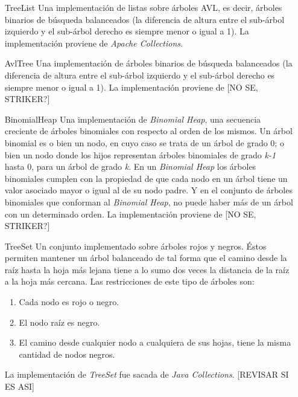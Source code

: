 \begin{enumerate}[leftmargin=.75cm,align=left,style=nextline]
	\item[TreeList] Una implementaci\'on de listas sobre \'arboles AVL, es decir, \'arboles binarios de b\'usqueda balanceados (la diferencia de altura entre el sub-\'arbol izquierdo y el sub-\'arbol derecho es siempre menor o igual a 1). La implementaci\'on proviene de \emph{Apache Collections}.
	
	\item[AvlTree] Una implementaci\'on de \'arboles binarios de b\'usqueda balanceados (la diferencia de altura entre el sub-\'arbol izquierdo y el sub-\'arbol derecho es siempre menor o igual a 1). La implementaci\'on proviene de [NO SE, STRIKER?]
	
	\item[BinomialHeap] Una implementaci\'on de \emph{Binomial Heap}, una secuencia creciente de \'arboles binomiales con respecto al orden de los mismos. Un \'arbol binomial es o bien un nodo, en cuyo caso se trata de un \'arbol de grado 0; o bien un nodo donde los hijos representan \'arboles binomiales de grado \emph{k-1} hasta 0, para un \'arbol de grado \emph{k}. En un \emph{Binomial Heap} los \'arboles binomiales cumplen con la propiedad de que cada nodo en un \'arbol tiene un valor asociado mayor o igual al de su nodo padre. Y en el conjunto de \'arboles binomiales que conforman al \emph{Binomial Heap}, no puede haber m\'as de un \'arbol con un determinado orden. La implementaci\'on proviene de [NO SE, STRIKER?]
	
	\item[TreeSet] Un conjunto implementado sobre \'arboles rojos y negros. \'Estos permiten mantener un \'arbol balanceado de tal forma que el camino desde la ra\'iz hasta la hoja m\'as lejana tiene a lo sumo dos veces la distancia de la ra\'iz a la hoja m\'as cercana. Las restricciones de este tipo de \'arboles son:
	\begin{enumerate}
		\item Cada nodo es rojo o negro.
		\item El nodo ra\'iz es negro.
		\item El camino desde cualquier nodo a cualquiera de sus hojas, tiene la misma cantidad de nodos negros.
	\end{enumerate}
	La implementaci\'on de \emph{TreeSet} fue sacada de \emph{Java Collections}. [REVISAR SI ES ASI]
	

\end{enumerate}
